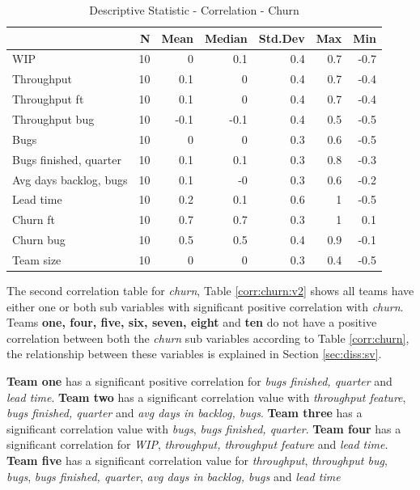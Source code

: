 \documentclass[UKenglish]{ifimaster}  %
\begin{document}
\begin{minipage}[t]{\linewidth}
\begin{table}[H]
\centering
 \begin{tabular}{ | l | r | r | r | r | r | r | }
 \hline
& \bf{N} & \bf{Mean} & \bf{Median} & \bf{Std.Dev} & \bf{Max} & \bf{Min} \\ \hline
WIP  & 10 & 0 & 0.1 & 0.4 & 0.7 & -0.7\\ \hline
Throughput  & 10 & 0.1 & 0 & 0.4 & 0.7 & -0.4\\ \hline
Throughput ft  & 10 & 0.1 & 0 & 0.4 & 0.7 & -0.4\\ \hline
Throughput bug  & 10 & -0.1 & -0.1 & 0.4 & 0.5 & -0.5\\ \hline
Bugs  & 10 & 0 & 0 & 0.3 & 0.6 & -0.5\\ \hline
Bugs finished, quarter  & 10 & 0.1 & 0.1 & 0.3 & 0.8 & -0.3\\ \hline
Avg days backlog, bugs  & 10 & 0.1 & -0 & 0.3 & 0.6 & -0.2\\ \hline
Lead time & 10 & 0.2 & 0.1 & 0.6 & 1 & -0.5\\ \hline
Churn ft  & 10 & 0.7 & 0.7 & 0.3 & 1 & 0.1\\ \hline
Churn bug  & 10 & 0.5 & 0.5 & 0.4 & 0.9 & -0.1\\ \hline
Team size  & 10 & 0 & 0 & 0.3 & 0.4 & -0.5\\ \hline
\end{tabular}
 \caption{Descriptive Statistic - Correlation - Churn}
 \label{DS:corr:Churn}
  \end{table}
  \end{minipage}
 
The second correlation table for \textit{churn}, Table \ref{corr:churn:v2} shows all teams have either one or both sub variables with significant positive correlation with \textit{churn}. Teams \textbf{one, four, five, six, seven, eight} and \textbf{ten} do not have a positive correlation between both the \textit{churn} sub variables according to Table \ref{corr:churn}, the relationship between these variables is explained in Section \ref{sec:diss:sv}. 

\textbf{Team one} has a significant positive correlation for \textit{bugs finished, quarter} and \textit{lead time}.  \textbf{Team two} has a significant correlation value with \textit{throughput feature}, \textit{bugs finished, quarter} and \textit{avg days in backlog, bugs}. \textbf{Team three} has a significant correlation value with \textit{bugs}, \textit{bugs finished, quarter}.  \textbf{Team four} has a significant correlation for \textit{WIP}, \textit{throughput, throughput feature} and \textit{lead time}. \textbf{Team five} has a significant correlation value for \textit{throughput}, \textit{throughput bug}, \textit{bugs}, \textit{bugs finished, quarter}, \textit{avg days in backlog, bugs} and \textit{lead time} 
\end{document}
